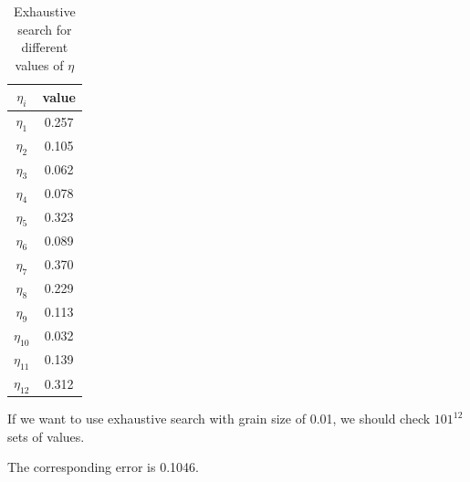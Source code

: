 \documentclass[a4paper]{article}
\begin{document}
\begin{table}[H]
\centering
\begin{tabular}{c|c}
\textbf{$\eta_{i}$} & \textbf{value} \\ \hline
                            
$\eta_{1}$ & 0.257 \\                                       
$\eta_{2}$ & 0.105 \\ 
$\eta_{3}$ & 0.062 \\ 
$\eta_{4}$ & 0.078 \\ 
$\eta_{5}$ & 0.323 \\ 
$\eta_{6}$ & 0.089 \\ 
$\eta_{7}$ & 0.370 \\ 
$\eta_{8}$ & 0.229 \\ 
$\eta_{9}$ & 0.113 \\ 
$\eta_{10}$ & 0.032 \\ 
$\eta_{11}$ & 0.139 \\ 
$\eta_{12}$ & 0.312 \\ 

\end{tabular}
\caption{Exhaustive search for different values of $\eta$}
\label{tab:exaustive_searchSSR}
\end{table}

If we want to use exhaustive search with grain size of 0.01, we should check $101^{12}$ sets of values.

The corresponding error is 0.1046.
\end{document}
